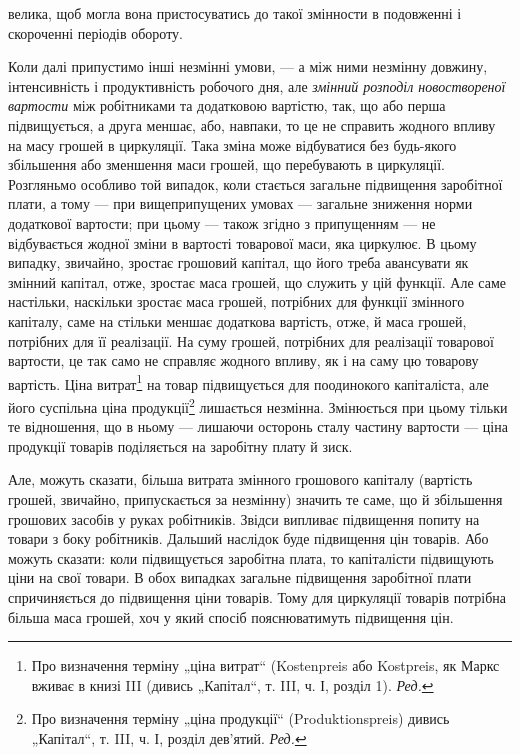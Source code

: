 \parcont{}  %
велика, щоб могла вона пристосуватись до такої змінности в подовженні
і скороченні періодів обороту.

Коли далі припустимо інші незмінні умови, — а між ними незмінну
довжину, інтенсивність і продуктивність робочого дня, але \emph{змінний
розподіл новоствореної вартости} між робітниками та додатковою
вартістю, так, що або перша підвищується, а друга меншає,
або, навпаки, то це не справить жодного впливу на масу грошей в
циркуляції. Така зміна може відбуватися без будь-якого збільшення або
зменшення маси грошей, що перебувають в циркуляції. Розгляньмо особливо
той випадок, коли стається загальне підвищення заробітної плати,
а тому — при вищеприпущених умовах — загальне зниження норми додаткової
вартости; при цьому — також згідно з припущенням — не відбувається
жодної зміни в вартості товарової маси, яка циркулює. В цьому
випадку, звичайно, зростає грошовий капітал, що його треба авансувати
як змінний капітал, отже, зростає маса грошей, що служить у цій
функції. Але саме настільки, наскільки зростає маса грошей, потрібних
для функції змінного капіталу, саме на стільки меншає додаткова вартість,
отже, й маса грошей, потрібних для її реалізації. На суму грошей,
потрібних для реалізації товарової вартости, це так само не справляє
жодного впливу, як і на саму цю товарову вартість. Ціна витрат\footnote*{
Про визначення терміну „ціна витрат“ (Kostenpreis або Kostpreis, як Маркс
вживає в книзі III (дивись „Капітал“, т. III, ч. І, розділ 1). \emph{Ред.}
} на
товар підвищується для поодинокого капіталіста, але його суспільна ціна
продукції\footnote*{
Про визначення терміну „ціна продукції“ (Produktionspreis) дивись „Капітал“,
т. III, ч. І, розділ дев’ятий. \emph{Ред.}
} лишається незмінна. Змінюється при цьому тільки те відношення,
що в ньому — лишаючи осторонь сталу частину вартости — ціна
продукції товарів поділяється на заробітну плату й зиск.

Але, можуть сказати, більша витрата змінного грошового капіталу
(вартість грошей, звичайно, припускається за незмінну) значить те саме,
що й збільшення грошових засобів у руках робітників. Звідси випливає
підвищення попиту на товари з боку робітників. Дальший наслідок буде
підвищення цін товарів. Або можуть сказати: коли підвищується заробітна
плата, то капіталісти підвищують ціни на свої товари. В обох випадках
загальне підвищення заробітної плати спричиняється до підвищення ціни
товарів. Тому для циркуляції товарів потрібна більша маса грошей, хоч
у який спосіб пояснюватимуть підвищення цін.

